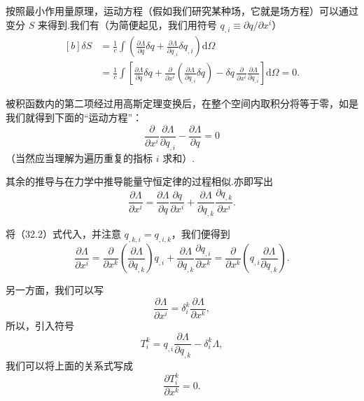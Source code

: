 按照最小作用量原理，运动方程（假如我们研究某种场，它就是场方程）可以通过变分 $S$
来得到.我们有（为简便起见，我们用符号 $q_{,i}\equiv\partial q/\partial x^i$）
\begin{equation*}
\begin{aligned}[b]
  \delta S&=\frac{1}{c}\int\left(\frac{\partial\varLambda}{\partial q}\delta q
  +\frac{\partial\varLambda}{\partial q_{,i}}\delta q_{,i}\right)\mathrm{d}\varOmega\\
  &=\frac{1}{c}\int\left[\frac{\partial\varLambda}{\partial q}\delta q
  +\frac{\partial}{\partial x^i}\left(\frac{\partial\varLambda}{\partial q_{,i}}\delta q\right)
  -\delta q\,\frac{\partial}{\partial x^i}\frac{\partial\varLambda}{\partial q_{,i}}\right]
  \mathrm{d}\varOmega=0.
\end{aligned}
\end{equation*}

被积函数内的第二项经过用高斯定理变换后，在整个空间内取积分将等于零，如是我们就得到下面的“运动方程”：
\begin{equation}
  \frac{\partial}{\partial x^i}\frac{\partial\varLambda}{\partial q_{,i}}
  -\frac{\partial\varLambda}{\partial q}=0
\end{equation}
（当然应当理解为遍历重复的指标 $i$ 求和）.

其余的推导与在力学中推导能量守恒定律的过程相似.亦即写出
\begin{equation*}
  \frac{\partial\varLambda}{\partial x^i}
  =\frac{\partial\varLambda}{\partial q}\frac{\partial q}{\partial x^i}
  +\frac{\partial\varLambda}{\partial q_{,k}}\frac{\partial q_{,k}}{\partial x^i}.
\end{equation*}

将（32.2）式代入，并注意 $q_{,k,i}=q_{,i,k}$，我们便得到
\begin{equation*}
  \frac{\partial\varLambda}{\partial x^i}
  =\frac{\partial}{\partial x^k}\left(\frac{\partial\varLambda}{\partial q_{,k}}\right)q_{,i}
  +\frac{\partial\varLambda}{\partial q_{,k}}\frac{\partial q_{,i}}{\partial x^k}
  =\frac{\partial}{\partial x^k}
  \left(q_{,i}\frac{\partial\varLambda}{\partial q_{,k}}\right).
\end{equation*}

另一方面，我们可以写
\begin{equation*}
  \frac{\partial\varLambda}{\partial x^i}
  =\delta_i^k\frac{\partial\varLambda}{\partial x^k},
\end{equation*}
所以，引入符号
\begin{equation}
  T_i^k=q_{,i}\frac{\partial\varLambda}{\partial q_{,k}}-\delta_i^k\varLambda,
\end{equation}
我们可以将上面的关系式写成
\begin{equation}
  \frac{\partial T_i^k}{\partial x^k}=0.
\end{equation}


